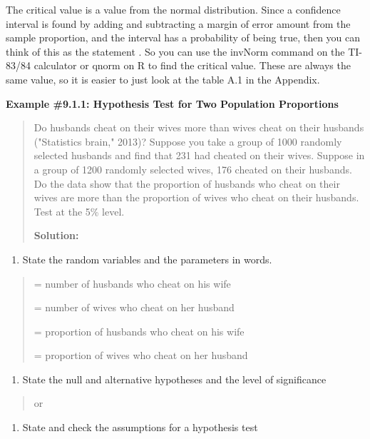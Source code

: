\documentclass[]{book}
\providecommand{\tightlist}{%
  \setlength{\itemsep}{0pt}\setlength{\parskip}{0pt}}
\begin{document}
The critical value is a value from the normal distribution. Since a
confidence interval is found by adding and subtracting a margin of error
amount from the sample proportion, and the interval has a probability of
being true, then you can think of this as the statement . So you can use
the invNorm command on the TI-83/84 calculator or qnorm on R to find the
critical value. These are always the same value, so it is easier to just
look at the table A.1 in the Appendix.

\textbf{Example \#9.1.1: Hypothesis Test for Two Population Proportions}

\begin{quote}
Do husbands cheat on their wives more than wives cheat on their
husbands ("Statistics brain," 2013)? Suppose you take a group of
1000 randomly selected husbands and find that 231 had cheated on their
wives. Suppose in a group of 1200 randomly selected wives, 176 cheated
on their husbands. Do the data show that the proportion of husbands
who cheat on their wives are more than the proportion of wives who
cheat on their husbands. Test at the 5\% level.

\textbf{Solution:}
\end{quote}

\begin{enumerate}
\def\labelenumi{\arabic{enumi}.}
\tightlist
\item
  State the random variables and the parameters in words.
\end{enumerate}

\begin{quote}
= number of husbands who cheat on his wife

= number of wives who cheat on her husband

= proportion of husbands who cheat on his wife

= proportion of wives who cheat on her husband
\end{quote}

\begin{enumerate}
\def\labelenumi{\arabic{enumi}.}
\setcounter{enumi}{1}
\tightlist
\item
  State the null and alternative hypotheses and the level of
  significance
\end{enumerate}

\begin{quote}
or
\end{quote}

\begin{enumerate}
\def\labelenumi{\arabic{enumi}.}
\setcounter{enumi}{2}
\tightlist
\item
  State and check the assumptions for a hypothesis test
\end{enumerate}
\end{document}
